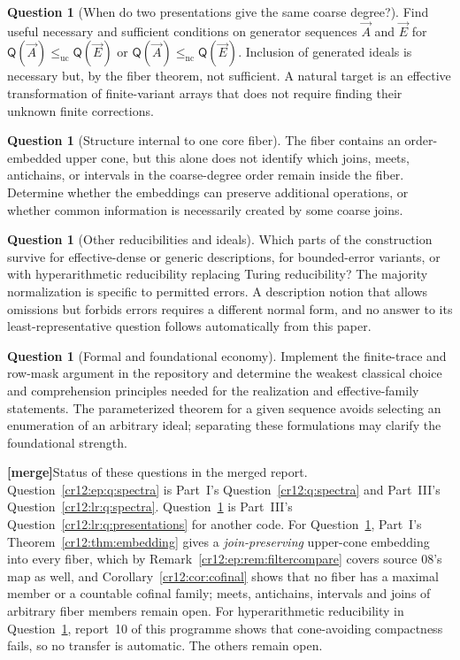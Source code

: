 \documentclass[11pt,letterpaper]{article}
\theoremstyle{plain}
\theoremstyle{definition}
\newtheorem{question}[theorem]{Question}
\theoremstyle{remark}
\numberwithin{equation}{section}
\newcommand{\leuc}{\leq_{\mathrm{uc}}}
\newcommand{\lenc}{\leq_{\mathrm{nc}}}
\newcommand{\mergenote}[1]{\par\smallskip\noindent
 {\small\textsf{\textbf{[merge]}}\enspace #1}\par\smallskip}
\newcommand{\QQ}{\mathsf Q}              %
\begin{document}
\begin{question}[When do two presentations give the same coarse degree?]\label{cr12:ep:q:presentations}
Find useful necessary and sufficient conditions on generator sequences $\vec A$ and
$\vec E$ for $\QQ(\vec A)\leuc\QQ(\vec E)$ or $\QQ(\vec A)\lenc\QQ(\vec E)$. Inclusion of
generated ideals is necessary but, by the fiber theorem, not sufficient. A natural
target is an effective transformation of finite-variant arrays that does not require
finding their unknown finite corrections.
\end{question}

\begin{question}[Structure internal to one core fiber]\label{cr12:ep:q:fibre}
The fiber contains an order-embedded upper cone, but this alone does not identify
which joins, meets, antichains, or intervals in the coarse-degree order remain inside
the fiber. Determine whether the embeddings can preserve additional operations, or
whether common information is necessarily created by some coarse joins.
\end{question}

\begin{question}[Other reducibilities and ideals]\label{cr12:ep:q:other}
Which parts of the construction survive for effective-dense or generic descriptions,
for bounded-error variants, or with hyperarithmetic reducibility replacing Turing
reducibility? The majority normalization is specific to permitted errors. A
description notion that allows omissions but forbids errors requires a different
normal form, and no answer to its least-representative question follows
automatically from this paper.
\end{question}

\begin{question}[Formal and foundational economy]\label{cr12:ep:q:formal}
Implement the finite-trace and row-mask argument in the repository and determine the
weakest classical choice and comprehension principles needed for the realization and
effective-family statements. The parameterized theorem for a given sequence avoids
selecting an enumeration of an arbitrary ideal; separating these formulations may
clarify the foundational strength.
\end{question}

\mergenote{Status of these questions in the merged report. Question~\ref{cr12:ep:q:spectra}
is Part~I's Question~\ref{cr12:q:spectra} and Part~III's
Question~\ref{cr12:lr:q:spectra}. Question~\ref{cr12:ep:q:presentations} is Part~III's
Question~\ref{cr12:lr:q:presentations} for another code. For
Question~\ref{cr12:ep:q:fibre}, Part~I's Theorem~\ref{cr12:thm:embedding} gives a
\emph{join-preserving} upper-cone embedding into every fiber, which by
Remark~\ref{cr12:ep:rem:filtercompare} covers source 08's map as well, and
Corollary~\ref{cr12:cor:cofinal} shows that no fiber has a maximal member or a
countable cofinal family; meets, antichains, intervals and joins of arbitrary fiber
members remain open. For hyperarithmetic reducibility in Question~\ref{cr12:ep:q:other},
report~10 of this programme shows that cone-avoiding compactness fails, so no
transfer is automatic. The others remain open.}
\end{document}
